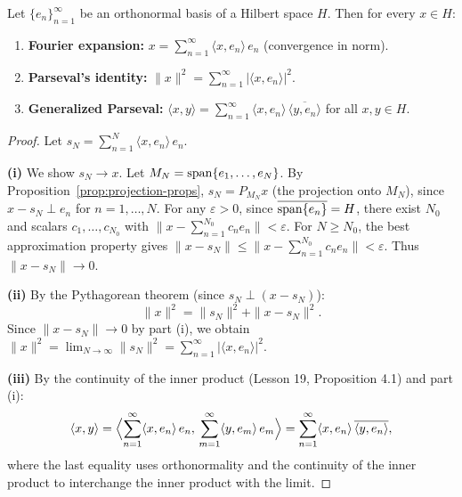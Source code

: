 \documentclass[11pt,a4paper]{article}
\begin{document}
\begin{theorem}
\label{thm:parseval}
Let $\{e_n\}_{n=1}^\infty$ be an orthonormal basis of a Hilbert space
$H$. Then for every $x \in H$:
\begin{enumerate}[label=(\roman*)]
    \item \textbf{Fourier expansion:}
          $x = \sum_{n=1}^\infty \langle x, e_n \rangle\, e_n$
          (convergence in norm).
    \item \textbf{Parseval's identity:}
          $\|x\|^2 = \sum_{n=1}^\infty |\langle x, e_n \rangle|^2$.
    \item \textbf{Generalized Parseval:}
          $\langle x, y \rangle = \sum_{n=1}^\infty
          \langle x, e_n \rangle\,
          \overline{\langle y, e_n \rangle}$
          for all $x, y \in H$.
\end{enumerate}
\end{theorem}

\begin{proof}
Let $s_N = \sum_{n=1}^N \langle x, e_n \rangle\, e_n$.

\textbf{(i)} We show $s_N \to x$. Let $M_N = \operatorname{span}\{e_1, \ldots, e_N\}$.
By Proposition~\ref{prop:projection-props}, $s_N = P_{M_N} x$ (the
projection onto $M_N$), since $x - s_N \perp e_n$ for
$n = 1, \ldots, N$. For any $\varepsilon > 0$, since
$\overline{\operatorname{span}\{e_n\}} = H$, there exist $N_0$ and scalars
$c_1, \ldots, c_{N_0}$ with
$\|x - \sum_{n=1}^{N_0} c_n e_n\| < \varepsilon$. For $N \geq N_0$,
the best approximation property gives
$\|x - s_N\| \leq \|x - \sum_{n=1}^{N_0} c_n e_n\| < \varepsilon$.
Thus $\|x - s_N\| \to 0$.

\textbf{(ii)} By the Pythagorean theorem (since $s_N \perp (x - s_N)$):
\[
    \|x\|^2 = \|s_N\|^2 + \|x - s_N\|^2.
\]
Since $\|x - s_N\| \to 0$ by part (i), we obtain
$\|x\|^2 = \lim_{N \to \infty} \|s_N\|^2
= \sum_{n=1}^\infty |\langle x, e_n \rangle|^2$.

\textbf{(iii)} By the continuity of the inner product
(Lesson 19, Proposition 4.1) and part (i):
\[
    \langle x, y \rangle
    = \Bigl\langle \sum_{n=1}^\infty \langle x, e_n \rangle\, e_n,\,
      \sum_{m=1}^\infty \langle y, e_m \rangle\, e_m \Bigr\rangle
    = \sum_{n=1}^\infty \langle x, e_n \rangle\,
      \overline{\langle y, e_n \rangle},
\]
where the last equality uses orthonormality and the continuity of the
inner product to interchange the inner product with the limit.
\end{proof}
\end{document}
